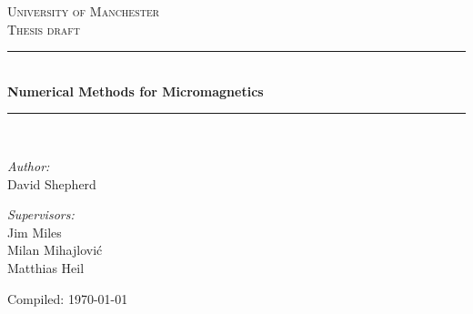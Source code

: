 \newcommand{\HRule}{\rule{\linewidth}{0.5mm}}

\begin{titlepage}

\begin{center}



\textsc{\LARGE University of Manchester}\\[1.5cm]

\textsc{\Large Thesis draft}\\[0.5cm]


\HRule \\[0.4cm]
{ \huge \bfseries Numerical Methods for Micromagnetics}\\[0.4cm]

\HRule \\[1.5cm]

\begin{minipage}{0.4\textwidth}
  \begin{flushleft} \large
    \emph{Author:}\\
    David Shepherd
  \end{flushleft}
\end{minipage}
\begin{minipage}{0.4\textwidth}
  \begin{flushright} \large
    \emph{Supervisors:} \\
    Jim Miles\\
    Milan Mihajlovi\'{c}\\
    Matthias Heil
  \end{flushright}
\end{minipage}

\vfill

{\large Compiled: \today}

\end{center}

\end{titlepage}


